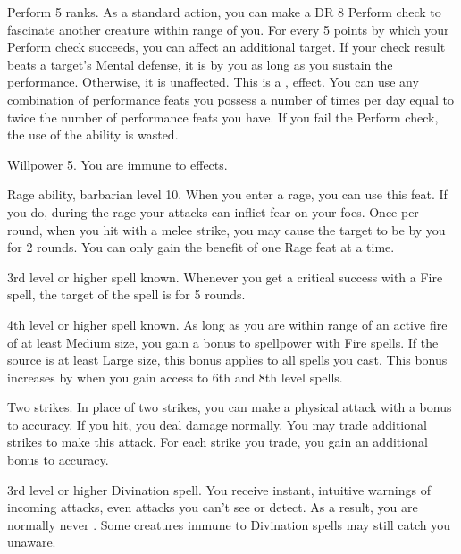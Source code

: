 \featpre Perform 5 ranks.
\featben As a standard action, you can make a DR 8 Perform check to fascinate another creature within \rngmed range of you.
For every 5 points by which your Perform check succeeds, you can affect an additional target.
If your check result beats a target's Mental defense, it is \fascinated by you as long as you sustain the performance.
Otherwise, it is unaffected.
This is a ,  effect.
You can use any combination of performance feats you possess a number of times per day equal to twice the number of performance feats you have.
If you fail the Perform check, the use of the ability is wasted.

\featpre Willpower 5.
\featben You are immune to  effects.

\featpres Rage ability, barbarian level 10.
\featben When you enter a rage, you can use this feat. If you do, during the rage your attacks can inflict fear on your foes.
Once per round, when you hit with a melee strike, you may cause the target to be \shaken by you for 2 rounds.
 You can only gain the benefit of one Rage feat at a time.

\featpre 3rd level or higher  spell known.
\featben Whenever you get a critical success with a Fire spell, the target of the spell is \ignited for 5 rounds.

\featpre 4th level or higher  spell known.
\featben As long as you are within \rngmed range of an active fire of at least Medium size, you gain a  bonus to spellpower with Fire spells.
If the source is at least Large size, this bonus applies to all spells you cast.
This bonus increases by  when you gain access to 6th and 8th level spells.

\featpre Two strikes.
\featben In place of two strikes, you can make a physical attack with a  bonus to accuracy.
If you hit, you deal damage normally.
You may trade additional strikes to make this attack.
For each strike you trade, you gain an additional  bonus to accuracy.

\featpre 3rd level or higher Divination spell.
\featben You receive instant, intuitive warnings of incoming attacks, even attacks you can't see or detect.
As a result, you are normally never \unaware.
Some creatures immune to Divination spells may still catch you unaware.

